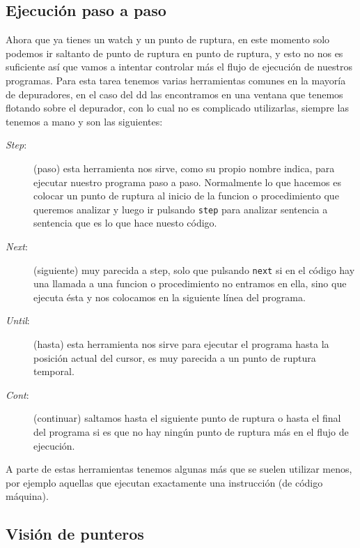 \subsection{Ejecución paso a paso}

Ahora que ya tienes un watch y un punto de ruptura, en este momento
solo podemos ir saltanto de punto de ruptura en punto de ruptura, y
esto no nos es suficiente así que vamos a intentar controlar más el
flujo de ejecución de nuestros programas. Para esta tarea tenemos varias
herramientas comunes en la mayoría de depuradores, en el caso del dd las
encontramos en una ventana que tenemos flotando sobre el depurador, con
lo cual no es complicado utilizarlas, siempre las tenemos a mano y son
las siguientes:

\begin{description}

\item[{\em Step}:]{(paso) esta herramienta nos sirve, como su propio
nombre indica, para ejecutar nuestro programa paso a paso. Normalmente
lo que hacemos es colocar un punto de ruptura al inicio de la funcion o
procedimiento que queremos analizar y luego ir pulsando {\tt step} para
analizar sentencia a sentencia que es lo que hace nuesto código.}

\item[{\em Next}:]{(siguiente) muy parecida a step, solo que pulsando
{\tt next} si en el código hay una llamada a una funcion o procedimiento
no entramos en ella, sino que ejecuta ésta y nos colocamos en la
siguiente línea del programa.}

\item[{\em Until}:]{(hasta) esta herramienta nos sirve para ejecutar el
programa hasta la posición actual del cursor, es muy parecida a un punto
de ruptura temporal.}

\item[{\em Cont}:]{(continuar) saltamos hasta el siguiente punto de
ruptura o hasta el final del programa si es que no hay ningún punto de
ruptura más en el flujo de ejecución.}

\end{description}

A  parte de  estas  herramientas  tenemos algunas  más  que se  suelen
utilizar  menos, por  ejemplo  aquellas que  ejecutan exactamente  una
instrucción (de código máquina).

\subsection{Visión de punteros}


